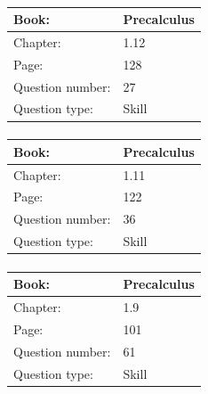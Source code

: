 \documentclass{article}
\begin{document}
            \paragraph{}
            \begin{tabularx}{1\textwidth}{
                    p{}
                    p{}
                }
                \toprule
                Book: & Precalculus
                \\
                \midrule
                Chapter: & 1.12
                \\
                \midrule
                Page: & 128
                \\
                \midrule
                Question number: & 27
                \\
                \midrule
                Question type: & Skill
                \\
                \bottomrule
            \end{tabularx}
            
            \paragraph{}
            \begin{tabularx}{1\textwidth}{
                    p{}
                    p{}
                }
                \toprule
                Book: & Precalculus
                \\
                \midrule
                Chapter: & 1.11
                \\
                \midrule
                Page: & 122
                \\
                \midrule
                Question number: & 36
                \\
                \midrule
                Question type: & Skill
                \\
                \bottomrule
            \end{tabularx}
            
            \paragraph{}
            \begin{tabularx}{1\textwidth}{
                    p{}
                    p{}
                }
                \toprule
                Book: & Precalculus
                \\
                \midrule
                Chapter: & 1.9
                \\
                \midrule
                Page: & 101
                \\
                \midrule
                Question number: & 61
                \\
                \midrule
                Question type: & Skill
                \\
                \bottomrule
            \end{tabularx}
            
\end{document}
